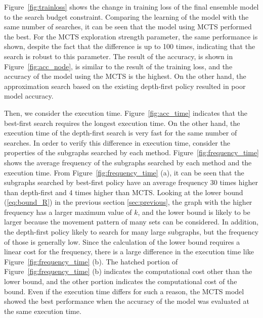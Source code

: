 Figure~\ref{fig:trainloss} shows the change in training loss 
of the final ensemble model to the search budget constraint.
Comparing the learning of the model with the same number of searches, 
it can be seen that the model using MCTS performed the best.
For the MCTS exploration strength parameter, 
the same performance is shown, despite the fact that the difference is up to 100 times, 
indicating that the search is robust to this parameter.
The result of the accuracy, is shown in Figure~\ref{fig:acc_node}, 
is similar to the result of the training loss, 
and the accuracy of the model using the MCTS is the highest. 
On the other hand, the approximation search based on the existing depth-first policy 
resulted in poor model accuracy.

Then, we consider the execution time.
Figure~\ref{fig:acc_time} indicates that 
the best-first search requires the longest execution time. 
On the other hand, the execution time of the depth-first search 
is very fast for the same number of searches.
In order to verify this difference in execution time, 
consider the properties of the subgraphs searched by each method.
Figure~\ref{fig:frequency_time} shows the average frequency of the subgraphs searched 
by each method and the execution time.
From Figure~\ref{fig:frequency_time} (a), it can be seen that the subgraphs searched by best-first policy 
have an average frequency 30 times higher than depth-first and 4 times higher than MCTS.
Looking at the lower bound (\ref{eq:bound_R}) in the previous section \ref{sec:previous}, 
the graph with the higher frequency has a larger maximum value of $k$, 
and the lower bound is likely to be larger 
because the movement pattern of many sets can be considered.
In addition, the depth-first policy likely to search for many large subgraphs, 
but the frequency of those is generally low.
Since the calculation of the lower bound requires a linear cost for the frequency, 
there is a large difference in the execution time like Figure~\ref{fig:frequency_time} (b).
The hatched portion of Figure~\ref{fig:frequency_time} (b) indicates the computational cost 
other than the lower bound, and the other portion indicates the computational cost of the bound.
Even if the execution time differs for such a reason, 
the MCTS model showed the best performance 
when the accuracy of the model was evaluated at the same execution time.

